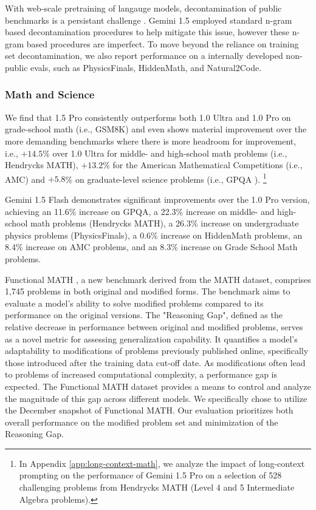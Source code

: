 With web-scale pretraining of langauge models, decontamination of public benchmarks is a persistant challenge \cite{gpt3, gpt4, geminiteam2023gemini}. Gemini 1.5 employed standard n-gram based decontamination procedures to help mitigate this issue, however these n-gram based procedures are imperfect. To move beyond the reliance on training set decontamination, we also report performance on a internally developed non-public evals, such as PhysicsFinals, HiddenMath, and Natural2Code.

\subsubsection{Math and Science} \label{subsubsec:RMS}

We find that 1.5 Pro consistently outperforms both 1.0 Ultra and 1.0 Pro on grade-school math (i.e., GSM8K) and even shows material improvement over the more demanding benchmarks where there is more headroom for improvement, i.e., $+14.5$\% over 1.0 Ultra for middle- and high-school math problems (i.e., Hendrycks MATH), $+13.2$\% for the American Mathematical Competitions (i.e., AMC) and $+5.8$\% on graduate-level science problems (i.e., GPQA \cite{rein2023gpqa}). \footnote{In Appendix \ref{app:long-context-math}, we analyze the impact of long-context prompting on the performance of Gemini 1.5 Pro on a selection of 528 challenging problems from Hendrycks MATH (Level 4 and 5 Intermediate Algebra problems).} 

Gemini 1.5 Flash demonstrates significant improvements over the 1.0 Pro version, achieving an 11.6\% increase on GPQA, a 22.3\% increase on middle- and high-school math problems (Hendrycks MATH), a 26.3\% increase on undergraduate physics problems (PhysicsFinals), a 0.6\% increase on HiddenMath problems, an 8.4\% increase on AMC problems, and an 8.3\% increase on Grade School Math problems. 

Functional MATH \citep{srivastava2024functional}, a new benchmark derived from the MATH dataset, comprises 1,745 problems in both original and modified forms. The benchmark aims to evaluate a model's ability to solve modified problems compared to its performance on the original versions. The "Reasoning Gap", defined as the relative decrease in performance between original and modified problems, serves as a novel metric for assessing generalization capability. It quantifies a model's adaptability to modifications of problems previously published online, specifically those introduced after the training data cut-off date. As modifications often lead to problems of increased computational complexity, a performance gap is expected. The Functional MATH dataset provides a means to control and analyze the magnitude of this gap across different models.  We specifically chose to utilize the December snapshot of Functional MATH. Our evaluation prioritizes both overall performance on the modified problem set and minimization of the Reasoning Gap. 

